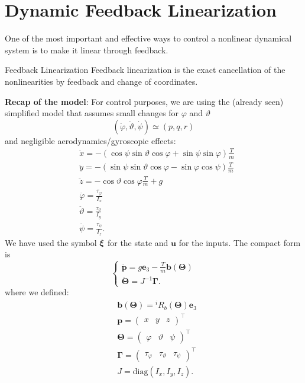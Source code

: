 \documentclass[10pt, a4paper]{report}
\begin{document}
\section{Dynamic Feedback Linearization}
One of the most important and effective ways to control a nonlinear dynamical system is to make it linear through feedback.
\begin{boxdefinition}{Feedback Linearization}{}
    Feedback linearization is the exact cancellation of the nonlinearities by
    feedback and change of coordinates.
\end{boxdefinition}
\noindent\textbf{Recap of the model}: For control purposes, we are using the (already seen) simplified model that assumes small changes for $\varphi$ and $\vartheta$
$$(\dot\varphi,\dot\vartheta,\dot\psi)\simeq(p,q,r)$$
and negligible aerodynamics/gyroscopic effects:\begin{align}
    &\ddot x = -(\cos\psi\sin\vartheta\cos\varphi+\sin\psi\sin\varphi)\frac{T}{m}\\
    &\ddot y = -(\sin\psi\sin\vartheta\cos\varphi-\sin\varphi\cos\psi)\frac{T}{m}\\
    &\ddot z = -\cos\vartheta\cos\varphi\frac{T}{m}+g\\
    & \ddot{\varphi} = \frac{\tau_\varphi}{I_x} \\
    & \ddot{\vartheta} = \frac{\tau_\vartheta}{I_y} \\
    & \ddot{\psi} = \frac{\tau_\psi}{I_z}\label{simplified_yaw_dynamics}.
\end{align}
We have used the symbol ${\boldsymbol{\xi}}$ for the state and $\mathbf u$ for the inputs. The compact form is\begin{equation}\label{compact_form}
\begin{cases}
    \ddot{\mathbf p}=g\mathbf e_3-\frac{T}{m}\mathbf b(\boldsymbol{\Theta})\\ 
    \ddot{\boldsymbol{\Theta}}=J^{-1}\boldsymbol{\Gamma}.
\end{cases}
\end{equation}
where we defined:\begin{align}
   &\mathbf  b(\boldsymbol{\Theta})={}^iR_b(\boldsymbol{\Theta})\mathbf e_3\\ 
   & \mathbf p = \begin{pmatrix}
    x&y&z
   \end{pmatrix}^\top\\ 
   &\boldsymbol{\Theta}=\begin{pmatrix}
   \varphi&\vartheta&\psi
   \end{pmatrix}^\top\\
   &\boldsymbol{\Gamma}=\begin{pmatrix}
   \tau_\varphi&\tau_\vartheta&\tau_\psi
   \end{pmatrix}^\top\\
   &J=\text{diag}(I_x,I_y,I_z).
\end{align}
\end{document}
